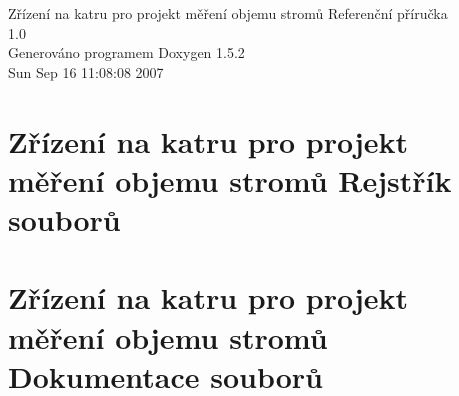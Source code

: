 \documentclass[a4paper]{book}
\begin{document}
\begin{titlepage}
\vspace*{7cm}
\begin{center}
{\Large Zřízení na katru pro projekt měření objemu stromů Referenční příručka\\[1ex]\large 1.0 }\\
\vspace*{1cm}
{\large Generováno programem Doxygen 1.5.2}\\
\vspace*{0.5cm}
{\small Sun Sep 16 11:08:08 2007}\\
\end{center}
\end{titlepage}
\clearemptydoublepage
{}
\tableofcontents
\clearemptydoublepage
{}
\chapter{Zřízení na katru pro projekt měření objemu stromů Rejstřík souborů}

\chapter{Zřízení na katru pro projekt měření objemu stromů Dokumentace souborů}












\printindex
\end{document}

